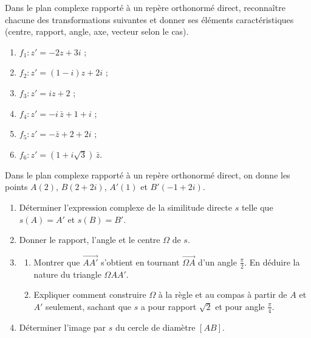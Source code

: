 \begin{exo}\label{exo:sim-reconnaissance}
      Dans le plan complexe rapporté à un repère orthonormé direct, reconnaître chacune des transformations suivantes
      et donner ses éléments caractéristiques (centre, rapport, angle, axe, vecteur selon le cas).
      \begin{enumerate}
            \item $f_1 : z' = -2z + 3i$ ;
            \item $f_2 : z' = (1 - i)z + 2i$ ;
            \item $f_3 : z' = iz + 2$ ;
            \item $f_4 : z' = -i\,\bar{z} + 1 + i$ ;
            \item $f_5 : z' = -\bar{z} + 2 + 2i$ ;
            \item $f_6 : z' = (1 + i\sqrt{3})\,\bar{z}$.
      \end{enumerate}
\end{exo}
\begin{exo}\label{exo:sim-deux-points}
      Dans le plan complexe rapporté à un repère orthonormé direct, on donne les points
      $A(2)$, $B(2 + 2i)$, $A'(1)$ et $B'(-1 + 2i)$.
      \begin{enumerate}
            \item Déterminer l'expression complexe de la similitude directe $s$ telle que $s(A) = A'$ et $s(B) = B'$.
            \item Donner le rapport, l'angle et le centre $\Omega$ de $s$.
            \item \begin{enumerate}
                        \item Montrer que $\overrightarrow{AA'}$ s'obtient en tournant $\overrightarrow{\Omega A}$ d'un angle $\frac{\pi}{2}$.
                              En déduire la nature du triangle $\Omega A A'$.
                        \item Expliquer comment construire $\Omega$ à la règle et au compas à partir de $A$ et $A'$ seulement,
                              sachant que $s$ a pour rapport $\sqrt{2}$ et pour angle $\frac{\pi}{4}$.
                  \end{enumerate}
            \item Déterminer l'image par $s$ du cercle de diamètre $[AB]$.
      \end{enumerate}
\end{exo}
